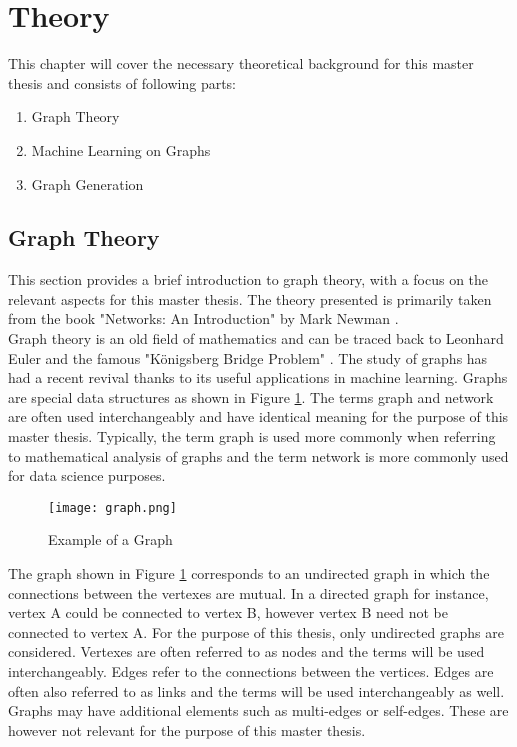 
	\section{Theory}

	This chapter will cover the necessary theoretical background for this
	master thesis and consists of following parts:

	\begin{enumerate}
		\item Graph Theory
		\item Machine Learning on Graphs
		\item Graph Generation
    \end{enumerate}

	\subsection{Graph Theory}

	This section provides a brief introduction to graph theory, with a focus on
	the relevant aspects for this master thesis. The theory presented is
	primarily taken from the book "Networks: An Introduction" by Mark Newman
	\citeyearpar{Newman2010}. \\

	\noindent Graph theory is an old field of mathematics and can be traced back 
	to Leonhard Euler and the famous "Königsberg Bridge Problem"
	\citep{euler1741solutio}. The study of graphs has had a recent revival
	thanks to its useful applications in machine learning. Graphs are special 
	data structures as shown in Figure \ref{fig:graph}. The terms graph and network 
	are often used interchangeably and have identical meaning for the purpose
	of this master thesis. Typically, the term graph is used more commonly when 
	referring to mathematical analysis of graphs and the term network is more 
	commonly used for data science purposes. \\

	\begin{figure}[h]
		\centering
		\texttt{[image: graph.png]}
		\caption{Example of a Graph}
		\cite[p. 111]{Newman2010}
		\label{fig:graph}
	\end{figure}
	
	\noindent The graph shown in Figure \ref{fig:graph} corresponds to an undirected graph
	in which the connections between the vertexes are mutual. In a directed
	graph for instance, vertex A could be connected to vertex B, however vertex
	B need not be connected to vertex A. For the purpose of this thesis, only
	undirected graphs are considered. Vertexes are often referred to as
	nodes and the terms will be used interchangeably. Edges refer to the
	connections between the vertices. Edges are often also referred to as links
	and the terms will be used interchangeably as well. Graphs may have
	additional elements such as multi-edges or self-edges. These are however
	not relevant for the purpose of this master thesis. \\

